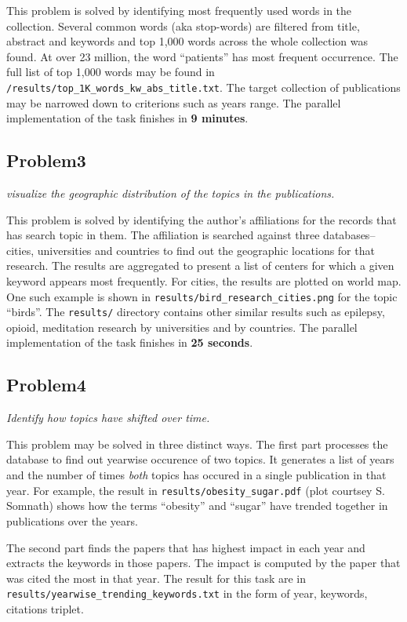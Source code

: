 \documentclass{article}
\begin{document}
This problem is solved by identifying most frequently used words in the
collection. Several common words (aka stop-words) are filtered from title,
abstract and keywords and top 1,000 words across the whole collection was
found. At over 23 million, the word ``patients'' has most frequent occurrence.
The full list of top 1,000 words may be found in
\texttt{/results/top\_1K\_words\_kw\_abs\_title.txt}. The target collection of
publications may be narrowed down to criterions such as years range.  The
parallel implementation of the task finishes in \textbf{9 minutes}.

\subsection*{Problem3}
\textit{visualize the geographic distribution of the topics in the publications.}

This problem is solved by identifying the author's affiliations for the records
that has search topic in them. The affiliation is searched against
three databases--cities, universities and countries to find out the geographic
locations for that research. The results are aggregated to present a list of
centers for which a given keyword appears most frequently. For cities, the
results are plotted on world map. One such example is shown in
\texttt{results/bird\_research\_cities.png} for the topic ``birds''. The \texttt{results/}
directory contains other similar results such as epilepsy, opioid,
meditation research by universities and by countries. The parallel
implementation of the task finishes in \textbf{25 seconds}.

\subsection*{Problem4}
\textit{Identify how topics have shifted over time.}

This problem may be solved in three distinct ways. The first part processes the
database to find out yearwise occurence of two topics. It generates a
list of years and the number of times \textit{both} topics has occured in a
single publication in that year. For example, the result in
\texttt{results/obesity\_sugar.pdf} (plot courtsey S.  Somnath) shows how the
terms ``obesity'' and ``sugar'' have trended together in publications over the
years.

The second part finds the papers that has highest impact in each year and
extracts the keywords in those papers. The impact is computed by the paper that
was cited the most in that year. The result for this task are in
\texttt{results/yearwise\_trending\_keywords.txt} in the form of year,
keywords, citations triplet.
\end{document}
